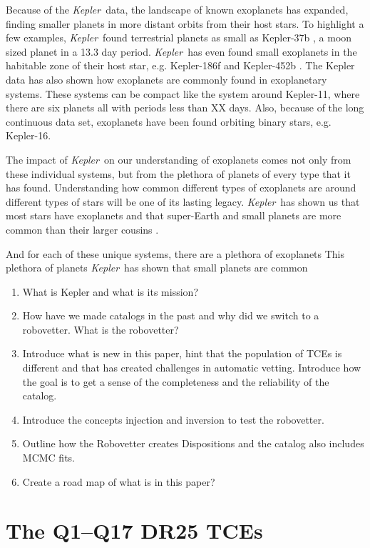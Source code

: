 \documentclass[onecolumn]{aastex6}
\newcommand\Kepler{\textit{Kepler}}
\begin{document}
Because of the \Kepler\ data, the landscape of known exoplanets has expanded, finding smaller planets in more distant orbits from their host stars.  To highlight a few examples,  \Kepler\ found terrestrial planets as small as Kepler-37b \citep{Barclay2013}, a moon sized planet in a 13.3 day period. \Kepler\ has even found small exoplanets in the habitable zone of their host star, e.g. Kepler-186f \citep{Quintana2014} and Kepler-452b \citep{Jenkins2015}.  The Kepler data has also shown how exoplanets are commonly found in exoplanetary systems. These systems can be compact like the system around Kepler-11, where there are six planets all with periods less than XX days. Also, because of the long continuous data set, exoplanets have been found orbiting binary stars, e.g. Kepler-16\citep{Doyle2011}.


The impact of \Kepler\ on our understanding of exoplanets comes not only from these individual systems, but from the plethora of planets of every type that it has found. Understanding how common different types of exoplanets are around different types of stars will be one of its lasting legacy. \Kepler\ has shown us that most stars have exoplanets and that super-Earth and small planets are more common than their larger cousins \citet{Burke2015}.   


And for each of these unique systems, there are a plethora of exoplanets This plethora of planets \Kepler\ has shown that small planets are common 

\begin{enumerate}
\item What is Kepler and what is its mission?
\item How have we made catalogs in the past and why did we switch to a robovetter. What is the robovetter?
\item Introduce what is new in this paper, hint that the population of TCEs is different and that has created challenges in automatic vetting. Introduce how the goal is to get a sense of the completeness and the reliability of the catalog.
\item Introduce the concepts injection and inversion to test the robovetter.
\item Outline how the Robovetter creates Dispositions and the catalog also includes MCMC fits.
\item Create a road map of what is in this paper?
\end{enumerate}

\section{The Q1--Q17 DR25 TCEs}

\end{document}
